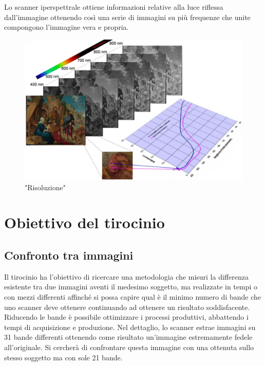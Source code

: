 \documentclass[a4paper,11pt]{article}
\begin{document}
        Lo scanner iperspettrale ottiene informazioni relative alla luce riflessa dall'immagine ottenendo così una serie di immagini su più frequenze che unite compongono l'immagine vera e propria.
    
    \newpage
    
        \begin{figure}[h]
            \centering
            \includegraphics[scale=0.4]{colorimetria4}
            \caption{"Risoluzione"}
        \end{figure}

    \newpage
    \section {Obiettivo del tirocinio}
    \subsection{Confronto tra immagini}
    Il tirocinio ha l’obiettivo di ricercare una metodologia che misuri la differenza esistente tra due immagini aventi il medesimo soggetto, ma realizzate in tempi o con mezzi differenti affinché si possa 
    capire qual è il minimo numero di bande che uno scanner deve ottenere continuando ad ottenere un risultato soddisfacente.
    Riducendo le bande è possibile ottimizzare i processi produttivi, abbattendo i tempi di acquisizione e produzione.
    Nel dettaglio, lo scanner estrae immagini su 31 bande differenti ottenendo come risultato un'immagine estremamente fedele all'originale. Si cercherà di confrontare questa immagine con una ottenuta sullo stesso soggetto ma con sole 21 bande. 
    
    \newpage
    
\end{document}

